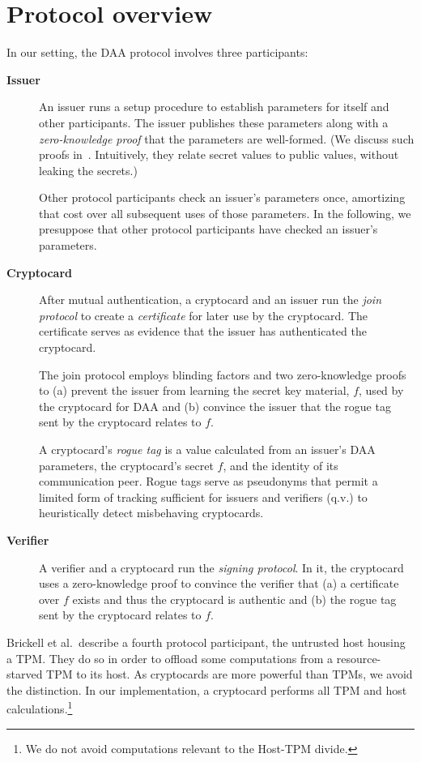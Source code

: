 \section{Protocol overview}

In our setting, the DAA protocol involves three participants:
\begin{description}

\item[\textbf{Issuer}]
An issuer runs a setup procedure to establish
parameters for itself and other participants.
The issuer publishes these parameters along with a
\emph{zero-knowledge proof} that the parameters
are well-formed. (We discuss such proofs in~. Intuitively,
they relate secret values to public values, without leaking the secrets.)

Other protocol participants check an issuer's parameters
once, amortizing that cost over all subsequent uses of those parameters.
In the following, we presuppose that other protocol participants have
checked an issuer's parameters.

\item[\textbf{Cryptocard}]
After mutual authentication, a cryptocard and an issuer run the \emph{join protocol}
to create a \emph{certificate} for later use by the cryptocard.
The certificate serves as evidence that the issuer has authenticated the cryptocard.

The join protocol employs blinding factors and two zero-knowledge proofs
to (a) prevent the issuer from learning the secret key material, $f$, used by the
cryptocard for DAA and (b) convince the issuer that the rogue tag
sent by the cryptocard relates to $f$.

A cryptocard's \emph{rogue tag} is a value calculated from an issuer's DAA parameters,
the cryptocard's secret $f$, and the identity of its communication peer.
Rogue tags serve as pseudonyms that permit a limited
form of tracking sufficient for issuers and verifiers (q.v.) to heuristically
detect misbehaving cryptocards.

\item[\textbf{Verifier}]
A verifier and a cryptocard run the \emph{signing protocol}.
In it, the cryptocard uses a zero-knowledge proof to convince
the verifier that (a) a certificate over $f$ exists and thus the cryptocard
is authentic and (b) the rogue tag sent by the cryptocard relates to $f$.

\end{description}
Brickell et al.\ describe a fourth protocol participant, the untrusted host
housing a TPM.
They do so in order to offload some computations from a resource-starved TPM
to its host.
As cryptocards are more powerful than TPMs, we avoid the distinction.
In our implementation, a cryptocard performs all TPM and
host calculations.\footnote{%
	We do not avoid computations relevant to the Host-TPM divide.}

